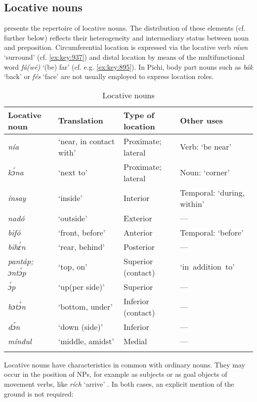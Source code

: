 \subsection{Locative nouns}\label{sec:8.1.2}
 presents the repertoire of locative nouns. The distribution of these elements (cf.  further below) reflects their heterogeneity and intermediary status between noun and preposition. Circumferential location is expressed via the locative verb \textit{ráwn} ‘surround’ (cf. \ref{ex:key:937}) and distal location by means of the multifunctional word \textit{fá(wé)} ‘(be) far’ (cf. e.g. \ref{ex:key:895}). In Pichi, body part nouns such as \textit{bák} ‘back’ or \textit{fés} ‘face’ are not usually employed to express location roles.

\begin{table}
\caption{Locative nouns}
\label{tab:key:8.2}

\begin{tabularx}{\textwidth}{lllQ}
\lsptoprule
Locative noun & Translation & Type of location & Other uses\\
\midrule 
\itshape nía & ‘near, in contact with’ & Proximate; lateral & Verb: ‘be near’\\
\itshape kɔ́na & ‘next to’ & Proximate; lateral & Noun: ‘corner’\\
\itshape ínsay & ‘inside’ & Interior & Temporal: ‘during, within’\\
\itshape nadó & ‘outside’ & Exterior & —\\
\itshape bifó & ‘front, before’ & Anterior & Temporal: ‘before’\\
\itshape bihɛ́n & ‘rear, behind’ & Posterior & —\\
\itshape pantáp; ɔntɔ́p & ‘top, on’ & Superior (contact) & \mbox{‘in addition to’}\\
\itshape ɔ́p & ‘up(per side)’ & Superior & —\\
\itshape bɔtɔ́n & ‘bottom, under’ & Inferior (contact) & —\\
\itshape dɔ́n & ‘down (side)’ & Inferior & —\\
\itshape míndul & ‘middle, amidst’ & Medial & —\\
\lspbottomrule
\end{tabularx}
\end{table}
Locative nouns have characteristics in common with ordinary nouns. They may occur in the position of \textsc{NP}s, for example as subjects  or as goal objects of movement verbs, like \textit{rích} ‘arrive’ . In both cases, an explicit mention of the ground is not required:


